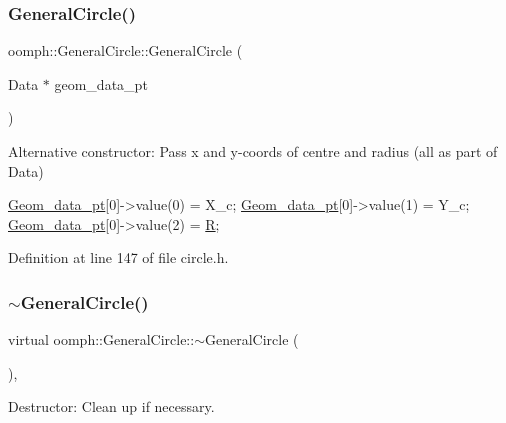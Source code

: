 \subsubsection{\texorpdfstring{General\+Circle()}{GeneralCircle()}\hspace{0.1cm}{\footnotesize\ttfamily [2/2]}}
{\footnotesize\ttfamily oomph\+::\+General\+Circle\+::\+General\+Circle (\begin{DoxyParamCaption}\item[{Data $\ast$}]{geom\+\_\+data\+\_\+pt }\end{DoxyParamCaption})\hspace{0.3cm}{\ttfamily [inline]}}



Alternative constructor\+: Pass x and y-\/coords of centre and radius (all as part of Data) 


\begin{DoxyCode}
\hyperlink{classoomph_1_1GeneralCircle_a4a707f37b32d447dbe965177e442aa76}{Geom\_data\_pt}[0]->value(0) = X\_c;
\hyperlink{classoomph_1_1GeneralCircle_a4a707f37b32d447dbe965177e442aa76}{Geom\_data\_pt}[0]->value(1) = Y\_c;
\hyperlink{classoomph_1_1GeneralCircle_a4a707f37b32d447dbe965177e442aa76}{Geom\_data\_pt}[0]->value(2) = \hyperlink{classoomph_1_1GeneralCircle_adc9df8b14326bddb144231b0be5d06c0}{R};
\end{DoxyCode}
 

Definition at line 147 of file circle.\+h.

\mbox{\label{classoomph_1_1GeneralCircle_a4ba230f7d22d7b116603115952ca50b0}} 
\subsubsection{\texorpdfstring{$\sim$\+General\+Circle()}{~GeneralCircle()}}
{\footnotesize\ttfamily virtual oomph\+::\+General\+Circle\+::$\sim$\+General\+Circle (\begin{DoxyParamCaption}{ }\end{DoxyParamCaption})\hspace{0.3cm}{\ttfamily [inline]}, {\ttfamily [virtual]}}



Destructor\+: Clean up if necessary. 



